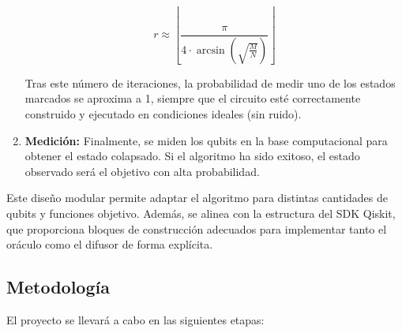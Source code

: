 \documentclass{article}
\begin{document}
\begin{enumerate}
    \[
    r \approx \left\lfloor \frac{\pi}{4 \cdot \arcsin\left( \sqrt{\frac{M}{N}} \right)} \right\rfloor
    \]

    Tras este número de iteraciones, la probabilidad de medir uno de los estados marcados se aproxima a 1, siempre que el circuito esté correctamente construido y ejecutado en condiciones ideales (sin ruido).


    \item \textbf{Medición:} Finalmente, se miden los qubits en la base computacional para obtener el estado colapsado. Si el algoritmo ha sido exitoso, el estado observado será el objetivo con alta probabilidad.
    
\end{enumerate}

Este diseño modular permite adaptar el algoritmo para distintas cantidades de qubits y funciones objetivo. Además, se alinea con la estructura del SDK Qiskit, que proporciona bloques de construcción adecuados para implementar tanto el oráculo como el difusor de forma explícita.

\subsection{Metodología}

El proyecto se llevará a cabo en las siguientes etapas:
\end{document}
